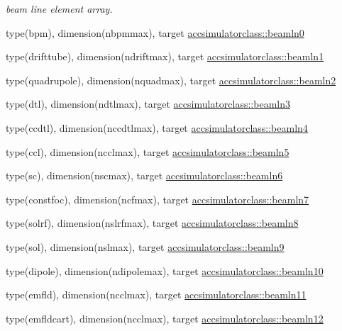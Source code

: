 \textbf{ }\par
{\em beam line element array. }\begin{DoxyCompactItemize}
\item 
type(bpm), dimension(nbpmmax), target \mbox{\hyperlink{namespaceaccsimulatorclass_a3c3a1b96070f5f9b755af7dc8502b457}{accsimulatorclass\+::beamln0}}
\item 
type(drifttube), dimension(ndriftmax), target \mbox{\hyperlink{namespaceaccsimulatorclass_a4afbfe5b21f1ef4f6ed80b26919a5b65}{accsimulatorclass\+::beamln1}}
\item 
type(quadrupole), dimension(nquadmax), target \mbox{\hyperlink{namespaceaccsimulatorclass_a84f0e00a948fce129634ef213a1e6146}{accsimulatorclass\+::beamln2}}
\item 
type(dtl), dimension(ndtlmax), target \mbox{\hyperlink{namespaceaccsimulatorclass_a676f0e0a8d52bb85779983a23300d307}{accsimulatorclass\+::beamln3}}
\item 
type(ccdtl), dimension(nccdtlmax), target \mbox{\hyperlink{namespaceaccsimulatorclass_aecdd8f634a42325f08705c6733739f5e}{accsimulatorclass\+::beamln4}}
\item 
type(ccl), dimension(ncclmax), target \mbox{\hyperlink{namespaceaccsimulatorclass_a1fe5a7819dc79e966a915ac7109a5921}{accsimulatorclass\+::beamln5}}
\item 
type(sc), dimension(nscmax), target \mbox{\hyperlink{namespaceaccsimulatorclass_aecb8568d8a048be9dd3f8ebf18c48e72}{accsimulatorclass\+::beamln6}}
\item 
type(constfoc), dimension(ncfmax), target \mbox{\hyperlink{namespaceaccsimulatorclass_aee9caad06453a0e66c229bf239519041}{accsimulatorclass\+::beamln7}}
\item 
type(solrf), dimension(nslrfmax), target \mbox{\hyperlink{namespaceaccsimulatorclass_a85003b545c7adc9e597e5fd6be9828c5}{accsimulatorclass\+::beamln8}}
\item 
type(sol), dimension(nslmax), target \mbox{\hyperlink{namespaceaccsimulatorclass_a7685c672080dfc1af30f91257a832844}{accsimulatorclass\+::beamln9}}
\item 
type(dipole), dimension(ndipolemax), target \mbox{\hyperlink{namespaceaccsimulatorclass_a62ff8549366c26dee5a585c8d900ebac}{accsimulatorclass\+::beamln10}}
\item 
type(emfld), dimension(ncclmax), target \mbox{\hyperlink{namespaceaccsimulatorclass_a016c645050aaca47150651536833a42d}{accsimulatorclass\+::beamln11}}
\item 
type(emfldcart), dimension(ncclmax), target \mbox{\hyperlink{namespaceaccsimulatorclass_aa02361c7e64269cdd2f65f92c7a44724}{accsimulatorclass\+::beamln12}}

\end{DoxyCompactItemize}
